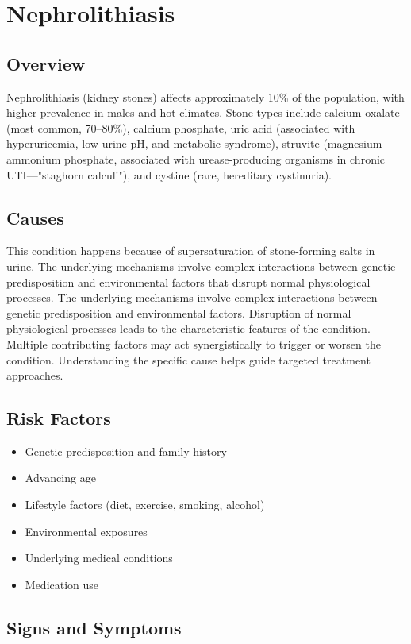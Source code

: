 \chapter{Nephrolithiasis}
\label{sec:Nephrolithiasis}

\section{Overview}
Nephrolithiasis (kidney stones) affects approximately 10\% of the population, with higher prevalence in males and hot climates. Stone types include calcium oxalate (most common, 70--80\%), calcium phosphate, uric acid (associated with hyperuricemia, low urine pH, and metabolic syndrome), struvite (magnesium ammonium phosphate, associated with urease-producing organisms in chronic UTI---"staghorn calculi"), and cystine (rare, hereditary cystinuria).
\section{Causes}
This condition happens because of supersaturation of stone-forming salts in urine. The underlying mechanisms involve complex interactions between genetic predisposition and environmental factors that disrupt normal physiological processes. The underlying mechanisms involve complex interactions between genetic predisposition and environmental factors. Disruption of normal physiological processes leads to the characteristic features of the condition. Multiple contributing factors may act synergistically to trigger or worsen the condition. Understanding the specific cause helps guide targeted treatment approaches.
\section{Risk Factors}


\begin{itemize}[noitemsep]
  \item Genetic predisposition and family history
  \item Advancing age
  \item Lifestyle factors (diet, exercise, smoking, alcohol)
  \item Environmental exposures
  \item Underlying medical conditions
  \item Medication use
\end{itemize}
\section{Signs and Symptoms}

